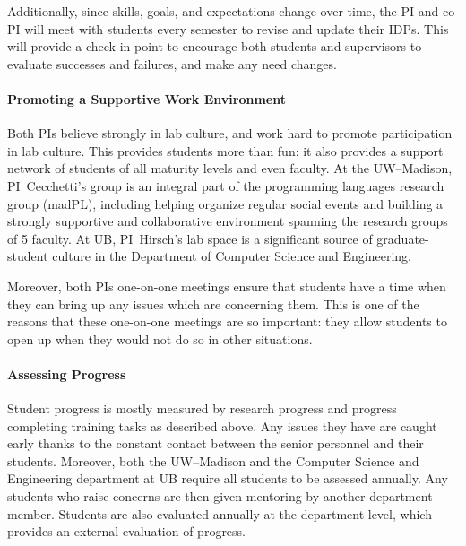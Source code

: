 Additionally, since skills, goals, and expectations change over time, the PI and co-PI will meet with students every semester to revise and update their IDPs.
This will provide a check-in point to encourage both students and supervisors to evaluate successes and failures, and make any need changes.


\paragraph{Promoting a Supportive Work Environment}

Both PIs believe strongly in lab culture, and work hard to promote participation in lab culture.
This provides students more than fun: it also provides a support network of students of all maturity levels and even faculty.
At the UW--Madison, PI~Cecchetti's group is an integral part of the programming languages research group (madPL),
including helping organize regular social events and building a strongly supportive and collaborative environment spanning the research groups of 5 faculty.
At UB, PI~Hirsch's  lab space is a significant source of graduate-student culture in the Department of Computer Science and Engineering.

Moreover, both PIs one-on-one meetings ensure that students have a time when they can bring up any issues which are concerning them.
This is one of the reasons that these one-on-one meetings are so important: they allow students to open up when they would not do so in other situations.

\paragraph{Assessing Progress}
Student progress is mostly measured by research progress and progress completing training tasks as described above.
Any issues they have are caught early thanks to the constant contact between the senior personnel and their students.
Moreover, both the UW--Madison and the Computer Science and Engineering department at UB require all students to be assessed annually.
Any students who raise concerns are then given mentoring by another department member.  Students are also evaluated annually at the department
level, which provides an external evaluation of progress.



